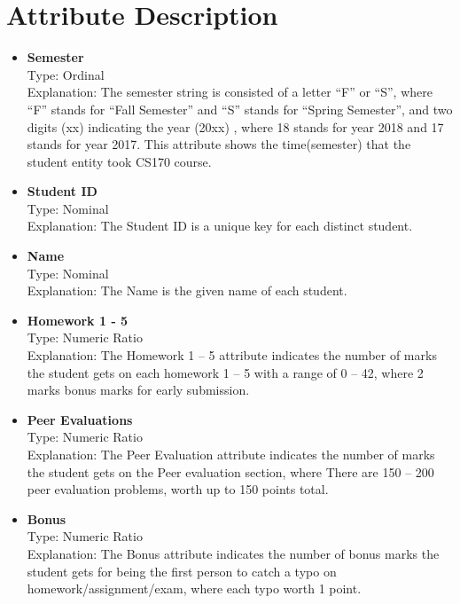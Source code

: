 \documentclass{article}
\begin{document}
\section{Attribute Description}
\begin{itemize}
    \item \textbf{Semester} \\
    Type: Ordinal \\
    Explanation: The semester string is consisted of a letter “F” or “S”, where “F” stands for “Fall Semester” and “S” stands for “Spring Semester”, and two digits (xx) indicating the year (20xx) , where 18 stands for year 2018 and 17 stands for year 2017. This attribute shows the time(semester) that the student entity took CS170 course. \\
    \item \textbf{Student ID} \\
    Type: Nominal \\
    Explanation: The Student ID is a unique key for each distinct student.\\
    \item \textbf{Name} \\
    Type: Nominal \\
    Explanation: The Name is the given name of each student.\\
    \item \textbf{Homework 1 - 5} \\
    Type: Numeric Ratio \\
    Explanation: The Homework 1 – 5 attribute indicates the number of marks the student gets on each homework 1 – 5 with a range of 0 – 42, where 2 marks bonus marks for early submission.\\
    \item \textbf{Peer Evaluations} \\
    Type: Numeric Ratio \\
    Explanation: The Peer Evaluation attribute indicates the number of marks the student gets on the Peer evaluation section, where There are 150 – 200 peer evaluation problems, worth up to 150 points total.\\
    \item \textbf{Bonus} \\
    Type: Numeric Ratio \\
    Explanation: The Bonus attribute indicates the number of bonus marks the student gets for being the first person to catch a typo on homework/assignment/exam, where each typo worth 1 point.\\

\end{itemize}
\end{document}
